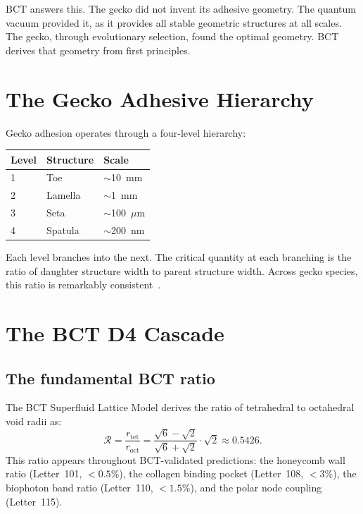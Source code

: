 \documentclass[12pt,twocolumn]{article}
\begin{document}
BCT answers this. The gecko did not invent its adhesive
geometry. The quantum vacuum provided it, as it provides all
stable geometric structures at all scales. The gecko, through
evolutionary selection, found the optimal geometry. BCT
derives that geometry from first principles.

\section{The Gecko Adhesive Hierarchy}

Gecko adhesion operates through a four-level hierarchy:

\begin{center}
{\small
\begin{tabular}{@{}p{1.6cm}p{1.8cm}p{2.0cm}@{}}
\toprule
Level & Structure & Scale \\
\midrule
1 & Toe & $\sim$10~mm \\
2 & Lamella & $\sim$1~mm \\
3 & Seta & $\sim$100~$\mu$m \\
4 & Spatula & $\sim$200~nm \\
\bottomrule
\end{tabular}}
\end{center}

\medskip
Each level branches into the next. The critical quantity at each
branching is the ratio of daughter structure width to parent
structure width. Across gecko species, this ratio is
remarkably consistent~\cite{Autumn2002,Geim2003}.

\section{The BCT D4 Cascade}

\subsection{The fundamental BCT ratio}

The BCT Superfluid Lattice Model derives the ratio of
tetrahedral to octahedral void radii as:
\begin{equation}
  \mathcal{R} = \frac{r_{\mathrm{tet}}}{r_{\mathrm{oct}}}
  = \frac{\sqrt{6}-\sqrt{2}}{\sqrt{6}+\sqrt{2}}
  \cdot \sqrt{2} \approx 0.5426.
\end{equation}
This ratio appears throughout BCT-validated predictions: the
honeycomb wall ratio (Letter~101, $<0.5\%$), the collagen
binding pocket (Letter~108, $<3\%$), the biophoton band ratio
(Letter~110, $<1.5\%$), and the polar node coupling
(Letter~115).
\end{document}
